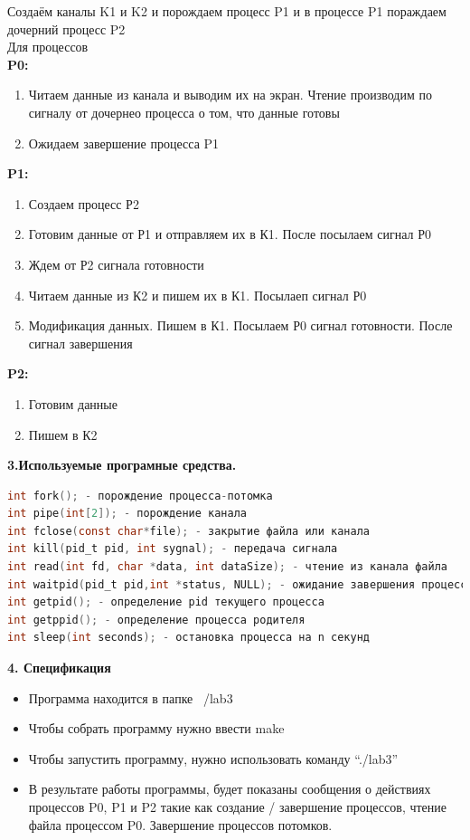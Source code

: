 \documentclass[a4paper,12pt]{article} %
\begin{document}
Создаём каналы K1 и K2 и порождаем процесс P1 и в процессе P1 пораждаем дочерний процесс P2\\
Для процессов\\
\textbf{P0:}
\begin{enumerate}
	\item Читаем данные из канала и выводим их на экран. Чтение производим по сигналу от 			дочернео процесса о том, что данные готовы
	\item Ожидаем завершение процесса P1
\end{enumerate}
\textbf{P1:}
\begin{enumerate}
	\item Создаем процесс Р2
	\item Готовим данные от Р1 и отправляем их в К1. После посылаем сигнал Р0
	\item Ждем от Р2 сигнала готовности
	\item Читаем данные из К2 и пишем их в К1. Посылаеп сигнал Р0
	\item Модификация данных. Пишем в К1. Посылаем Р0 сигнал готовности. После сигнал завершения
\end{enumerate}
\textbf{P2:}
\begin{enumerate}
	\item Готовим данные
	\item Пишем в К2
\end{enumerate}
\newpage

\begin{Large}
\textbf{3.Используемые програмные средства.}\\
\end{Large}

\begin{lstlisting}[language=C]
int fork(); - порождение процесса-потомка
int pipe(int[2]); - порождение канала
int fclose(const char*file); - закрытие файла или канала
int kill(pid_t pid, int sygnal); - передача сигнала
int read(int fd, char *data, int dataSize); - чтение из канала файла
int waitpid(pid_t pid,int *status, NULL); - ожидание завершения процесса-потомка
int getpid(); - определение pid текущего процесса
int getppid(); - определение процесса родителя 
int sleep(int seconds); - остановка процесса на n секунд
\end{lstlisting}

\begin{Large}
\textbf{4. Спецификация}\\
\end{Large}
\begin{itemize}
\item Программа находится в папке ~/lab3
\item Чтобы собрать программу нужно ввести make
\item Чтобы запустить программу, нужно использовать команду “./lab3”
\item В результате работы программы, будет показаны сообщения о действиях процессов P0, P1 и P2 такие как создание / завершение процессов, чтение файла процессом P0. Завершение процессов потомков.  
\end{itemize}
\end{document}
